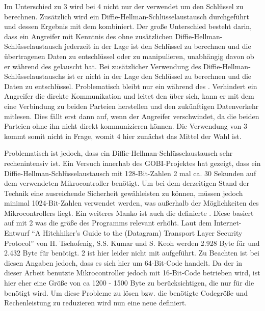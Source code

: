 Im Unterschied zu  3 wird bei  4 nicht nur der  verwendet um den Schlüssel zu berechnen. Zusätzlich wird ein
Diffie-Hellman-Schlüsselaustausch durchgeführt und dessen Ergebnis mit dem  kombiniert. Der große Unterschied besteht darin, dass
ein Angreifer mit Kenntnis des  ohne zusätzlichen Diffie-Hellman-Schlüsselaustausch jederzeit in der Lage ist den Schlüssel zu
berechnen und die übertragenen Daten zu entschlüssel oder zu manipulieren, unabhängig davon ob er während des  gelauscht hat.
Bei zusätzlicher Verwendung des Diffie-Hellman-Schlüsselaustauschs ist er nicht in der Lage den Schlüssel zu berechnen und die Daten zu
entschlüssel. Problematisch bleibt nur ein  während des . Verhindert ein Angreifer die direkte
Kommunikation und leitet den  über sich, kann er mit dem  eine Verbindung zu beiden Parteien herstellen und den
zukünftigen Datenverkehr mitlesen. Dies fällt erst dann auf, wenn der Angreifer verschwindet, da die beiden Parteien ohne ihn nicht
direkt kommunizieren können. Die Verwendung von  3 kommt somit nicht in Frage, womit  4 hier zunächst das Mittel
der Wahl ist.

Problematisch ist jedoch, dass ein Diffie-Hellman-Schlüsselaustausch sehr rechenintensiv ist. Ein Versuch innerhab des GOBI-Projektes hat
gezeigt, dass ein Diffie-Hellman-Schlüsselaustausch mit 128-Bit-Zahlen 2 mal ca. 30 Sekunden auf dem verwendeten Mikrocontroller benötigt.
Um bei dem derzeitigen Stand der Technik eine ausreichende Sicherheit gewähleisten zu können, müssen jedoch minimal 1024-Bit-Zahlen
verwendet werden, was außerhalb der Möglichkeiten des Mikrocontrollers liegt. Ein weiteres Manko ist auch die definierte .
Diese basiert auf  mit 2 was die größe des Programms relevant erhöht. Laut dem Internet-Entwurf "`A Hitchhiker's
Guide to the (Datagram) Transport Layer Security Protocol"' \cite{draftmintls} von H. Tschofenig, S.S. Kumar und S. Keoh werden
2.928 Byte für  und 2.432 Byte für  benötigt. 2 ist hier leider nicht mit aufgeführt. Zu Beachten ist bei diesen Angaben
jedoch, dass es sich hier um 64-Bit-Code handelt. Da der in dieser Arbeit benutzte Mikrocontroller jedoch mit 16-Bit-Code betrieben wird, ist hier
eher eine Größe von ca 1200 - 1500 Byte zu berücksichtigen, die nur für die  benötigt wird. Um diese Probleme zu lösen bzw. die benötigte
Codegröße und Rechenleistung zu reduzieren wird nun eine neue  definiert.

